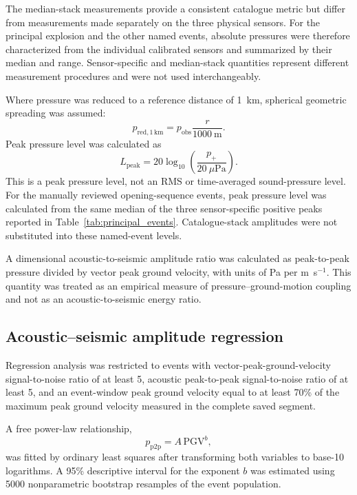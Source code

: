 \documentclass[]{seismica}
\begin{document}
The median-stack measurements provide a consistent catalogue metric but differ
from measurements made separately on the three physical sensors. For the
principal explosion and the other named events, absolute pressures were
therefore characterized from the individual calibrated sensors and summarized
by their median and range. Sensor-specific and median-stack quantities
represent different measurement procedures and were not used interchangeably.

Where pressure was reduced to a reference distance of 1~km, spherical geometric spreading was assumed:
\begin{equation}
  p_{\mathrm{red},1\,\mathrm{km}} = p_{\mathrm{obs}}\frac{r}{1000~\mathrm{m}}.
  \label{eq:reduced_pressure}
\end{equation}
Peak pressure level was calculated as
\begin{equation}
  L_{\mathrm{peak}} = 20\log_{10}\left(\frac{p_+}{20~\mu\mathrm{Pa}}\right).
  \label{eq:peak_pressure_level}
\end{equation}
This is a peak pressure level, not an RMS or time-averaged sound-pressure level.
For the manually reviewed opening-sequence events, peak pressure level was
calculated from the same median of the three sensor-specific positive peaks
reported in Table~\ref{tab:principal_events}. Catalogue-stack amplitudes were
not substituted into these named-event levels.

A dimensional acoustic-to-seismic amplitude ratio was calculated as peak-to-peak pressure divided by vector peak ground velocity, with units of Pa per m~s$^{-1}$. This quantity was treated as an empirical measure of pressure--ground-motion coupling and not as an acoustic-to-seismic energy ratio.

\subsection{Acoustic--seismic amplitude regression}

Regression analysis was restricted to events with vector-peak-ground-velocity signal-to-noise ratio of at least 5, acoustic peak-to-peak signal-to-noise ratio of at least 5, and an event-window peak ground velocity equal to at least 70\% of the maximum peak ground velocity measured in the complete saved segment.

A free power-law relationship,
\begin{equation}
  p_{\mathrm{p2p}} = A\,\mathrm{PGV}^{b},
  \label{eq:power_law}
\end{equation}
was fitted by ordinary least squares after transforming both variables to base-10 logarithms. A 95\% descriptive interval for the exponent $b$ was estimated using 5000 nonparametric bootstrap resamples of the event population.
\end{document}
